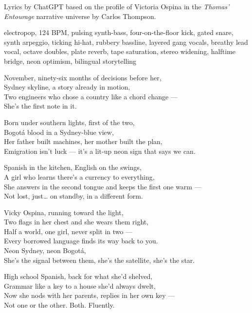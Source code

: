
\begin{notes}
Lyrics by ChatGPT based on the profile of Victoria Ospina in the \emph{Thomas’ Entourage} narrative universe by Carlos Thompson.
\end{notes}
\begin{style}
electropop, 124 BPM, pulsing synth-bass, four-on-the-floor kick, gated snare, synth arpeggio, ticking hi-hat, rubbery bassline, layered gang vocals, breathy lead vocal, octave doubles, plate reverb, tape saturation, stereo widening, halftime bridge, neon optimism, bilingual storytelling
\end{style}
\begin{lyrics}
November, ninety-six months of decisions before her,\\
Sydney skyline, a story already in motion,\\
Two engineers who chose a country like a chord change —\\
She's the first note in it.

Born under southern lights, first of the two,\\
Bogotá blood in a Sydney-blue view,\\
Her father built machines, her mother built the plan,\\
Emigration isn't luck — it's a lit-up neon sign that says we can.

Spanish in the kitchen, English on the swings,\\
A girl who learns there's a currency to everything,\\
She answers in the second tongue and keeps the first one warm —\\
Not lost, just… on standby, in a different form.

Vicky Ospina, running toward the light,\\
Two flags in her chest and she wears them right,\\
Half a world, one girl, never split in two —\\
Every borrowed language finds its way back to you.\\
Neon Sydney, neon Bogotá,\\
She's the signal between them, she's the satellite, she's the star.

High school Spanish, back for what she'd shelved,\\
Grammar like a key to a house she'd always dwelt,\\
Now she nods with her parents, replies in her own key —\\
Not one or the other. Both. Fluently.


\end{lyrics}
